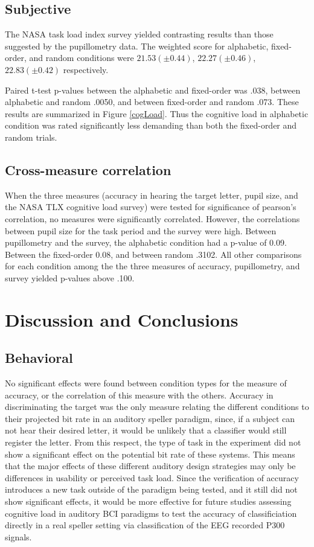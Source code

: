\documentclass[10pt]{article}
\begin{document}
\subsection{Subjective}

The NASA task load index survey yielded contrasting results than
those suggested by the pupillometry data.  
The weighted score for alphabetic, fixed-order, and random
conditions were 
$21.53 (\pm 0.44)$, $22.27 (\pm 0.46)$, $22.83 (\pm
0.42)$ respectively.

Paired t-test p-values between the alphabetic and fixed-order was
.038, between alphabetic and random .0050, and between fixed-order
and random .073.  These results are summarized in Figure
\ref{cogLoad}.  Thus the cognitive load in alphabetic condition was
rated significantly less demanding than both the fixed-order and
random trials.

\subsection{Cross-measure correlation} 
When the three measures
(accuracy in hearing the target letter, pupil size, and the NASA TLX
cognitive load survey) were tested for significance of pearson's
correlation, no measures were significantly correlated.  However,
the correlations between pupil size for the task period and the
survey were high.  Between pupillometry and the survey,
the alphabetic condition had a p-value of 0.09.  Between the
fixed-order 0.08, and between random .3102.  All other comparisons
for each condition among the the three measures of accuracy, pupillometry, and survey
yielded p-values above .100.

\section{Discussion and Conclusions}

\subsection{Behavioral}

No significant effects were found between condition types for
the measure of accuracy, or the correlation of this measure
with the others.  Accuracy in discriminating the target was the
only measure relating the different conditions to their
projected bit rate in an auditory speller paradigm, since, if
a subject can not hear their desired letter, it would be
unlikely that a classifier would still register the letter.
From this respect, the type of task in the experiment did not
show a significant effect on the potential bit rate of these
systems. This means that the major effects of these different
auditory design strategies may only be differences in usability or
perceived task load. Since
the verification of accuracy introduces a new task outside of
the paradigm being tested, and it still did not show
significant effects, it would be more effective for future
studies assessing cognitive load in auditory BCI paradigms
to test the accuracy of classificiation directly in a real
speller setting via classification of the EEG recorded P300
signals.
\end{document}
